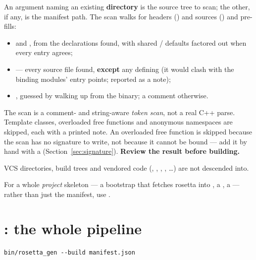 An argument naming an existing \textbf{directory} is the source tree to scan;
the other, if any, is the manifest path. The scan walks for headers
() and sources () and pre-fills:

\begin{itemize}
  \item {} and , from the declarations found, with
    shared  /  defaults factored out when
    every entry agrees;
  \item {} --- every source file found, \textbf{except} any
    defining  (it would clash with the binding modules' entry
    points; reported as a note);
  \item {}, guessed by walking up from the
     binary; a  comment otherwise.
\end{itemize}

\begin{warn}
The scan is a comment- and string-aware \emph{token scan}, not a real C++ parse.
Template classes, overloaded free functions and anonymous namespaces are
skipped, each with a printed note. An overloaded free function is skipped
because the scan has no signature to write, not because it cannot be bound ---
add it by hand with a  (Section~\ref{sec:signature}).
\textbf{Review the result before building.}
\end{warn}

VCS directories, build trees and vendored code (, ,
, , \ldots) are not descended into.

\begin{note}
For a whole \emph{project} skeleton --- a bootstrap  that
fetches rosetta into , a , a  ---
rather than just the manifest, use .
\end{note}

\section{: the whole pipeline}

\begin{lstlisting}[style=sh]
bin/rosetta_gen --build manifest.json
\end{lstlisting}

